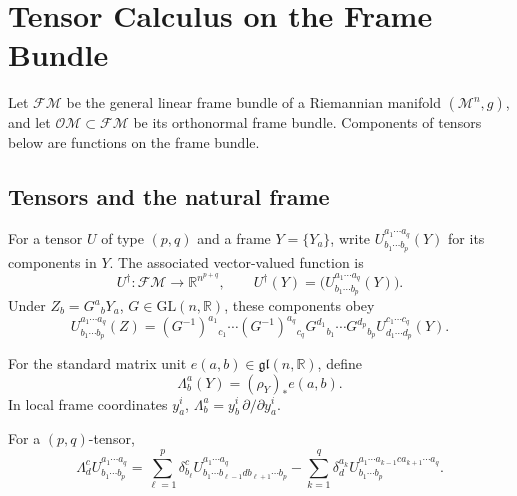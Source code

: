 \chapter{Tensor Calculus on the Frame Bundle}
\label{app:chow-ii-frame-bundle-tensor-calculus}

Let $\mathcal F\mathcal M$ be the general linear frame
bundle of a Riemannian manifold $(\mathcal M^n,g)$, and let
$\mathcal O\mathcal M\subset\mathcal F\mathcal M$ be its orthonormal frame
bundle.  Components of tensors below are functions on the frame bundle.

\section{Tensors and the natural frame}

\begin{definition}
\label{def:chow-ii-frame-tensor-components}
For a tensor $U$ of type $(p,q)$ and a frame $Y=\{Y_a\}$, write
$U^{a_1\cdots a_q}_{b_1\cdots b_p}(Y)$ for its components in $Y$.  The
associated vector-valued function is
\[
 U^\dagger:\mathcal F\mathcal M\longrightarrow
 \mathbb R^{n^{p+q}},\qquad
 U^\dagger(Y)=\bigl(U^{a_1\cdots a_q}_{b_1\cdots b_p}(Y)\bigr).
\]
Under $Z_b=G^a{}_bY_a$, $G\in\mathrm{GL}(n,\mathbb R)$, these components obey
\[
 U^{a_1\cdots a_q}_{b_1\cdots b_p}(Z)=
 (G^{-1})^{a_1}{}_{c_1}\cdots(G^{-1})^{a_q}{}_{c_q}
 G^{d_1}{}_{b_1}\cdots G^{d_p}{}_{b_p}
 U^{c_1\cdots c_q}_{d_1\cdots d_p}(Y).
\]
\end{definition}

\begin{definition}
\label{def:chow-ii-vertical-frame-fields}
For the standard matrix unit $e(a,b)\in\mathfrak{gl}(n,\mathbb R)$, define
\[
 \Lambda^a_b(Y)=(\rho_Y)_*e(a,b).
\]
In local frame coordinates $y_a^i$,
$\Lambda^a_b=y_b^i\,\partial/\partial y_a^i$.
\end{definition}

\begin{lemma}
\label{lem:chow-ii-vertical-tensor-action}
For a $(p,q)$-tensor,
\[
 \Lambda^c_d U^{a_1\cdots a_q}_{b_1\cdots b_p}
 =\sum_{\ell=1}^p\delta^c_{b_\ell}
 U^{a_1\cdots a_q}_{b_1\cdots b_{\ell-1}d b_{\ell+1}\cdots b_p}
 -\sum_{k=1}^q\delta^{a_k}_d
 U^{a_1\cdots a_{k-1}c a_{k+1}\cdots a_q}_{b_1\cdots b_p}.
\]
\end{lemma}

